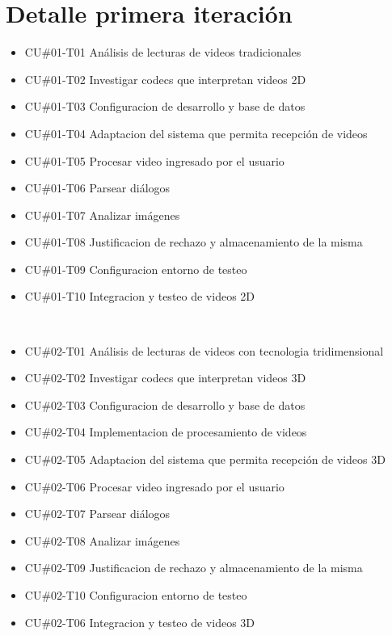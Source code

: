 \section{Detalle primera iteración}

\begin{itemize}
    \item CU\#01-T01 Análisis de lecturas de videos tradicionales
    \item CU\#01-T02 Investigar codecs que interpretan videos 2D
    \item CU\#01-T03 Configuracion de desarrollo y base de datos
    \item CU\#01-T04 Adaptacion del sistema que permita recepción de videos
    \item CU\#01-T05 Procesar video ingresado por el usuario
    \item CU\#01-T06 Parsear diálogos
    \item CU\#01-T07 Analizar imágenes 
    \item CU\#01-T08 Justificacion de rechazo y almacenamiento de la misma
    \item CU\#01-T09 Configuracion entorno de testeo
    \item CU\#01-T10 Integracion y testeo de videos 2D
\end{itemize}
    
                   
\begin{itemize}
    \item CU\#02-T01 Análisis de lecturas de videos con tecnologia tridimensional
    \item CU\#02-T02 Investigar codecs que interpretan videos 3D
    \item CU\#02-T03 Configuracion de desarrollo y base de datos
    \item CU\#02-T04 Implementacion de procesamiento de videos
    \item CU\#02-T05 Adaptacion del sistema que permita recepción de videos 3D
    \item CU\#02-T06 Procesar video ingresado por el usuario
    \item CU\#02-T07 Parsear diálogos
    \item CU\#02-T08 Analizar imágenes 
    \item CU\#02-T09 Justificacion de rechazo y almacenamiento de la misma
    \item CU\#02-T10 Configuracion entorno de testeo
    \item CU\#02-T06 Integracion y testeo de videos 3D  
\end{itemize}


